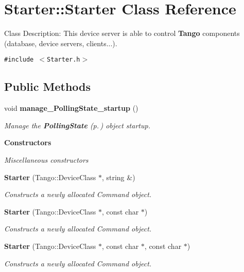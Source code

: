 \section{Starter::Starter  Class Reference}
\label{classStarter_1_1Starter}
Class Description: This device server is able to control {\bf Tango} components (database, device servers, clients...). 


{\tt \#include $<$Starter.h$>$}

\subsection*{Public Methods}
\begin{CompactItemize}
\item 
void {\bf manage\_\-Polling\-State\_\-startup} ()
\begin{CompactList}\small\item\em Manage the {\bf Polling\-State} {\rm (p.\,\pageref{classStarter_1_1PollingState})} object startup.\item\end{CompactList}\end{CompactItemize}
\begin{Indent}{\bf Constructors}\par
{\em Miscellaneous constructors}\begin{CompactItemize}
\item 
{\bf Starter} (Tango::Device\-Class $\ast$, string \&)
\begin{CompactList}\small\item\em Constructs a newly allocated Command object.\item\end{CompactList}\item 
{\bf Starter} (Tango::Device\-Class $\ast$, const char $\ast$)
\begin{CompactList}\small\item\em Constructs a newly allocated Command object.\item\end{CompactList}\item 
{\bf Starter} (Tango::Device\-Class $\ast$, const char $\ast$, const char $\ast$)
\begin{CompactList}\small\item\em Constructs a newly allocated Command object.\item\end{CompactList}\end{CompactItemize}
\end{Indent}
